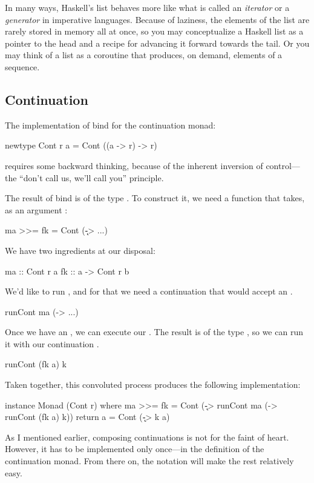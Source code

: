 \documentclass[DaoFP]{subfiles}
\begin{document}
In many ways, Haskell's list behaves more like what is called an \emph{iterator} or a \emph{generator} in imperative languages. Because of laziness, the elements of the list are rarely stored in memory all at once, so you may conceptualize a Haskell list as a pointer to the head and a recipe for advancing it forward towards the tail. Or you may think of a list as a coroutine that produces, on demand, elements of a sequence.

\subsection{Continuation}

The implementation of bind for the continuation monad:

\begin{haskell}
newtype Cont r a = Cont ((a -> r) -> r)
\end{haskell}
requires some backward thinking, because of the inherent inversion of control---the ``don't call us, we'll call you'' principle. 

The result of bind is of the type . To construct it, we need a function that takes, as an argument :
\begin{haskell}
ma >>= fk = Cont (\k -> ...)
\end{haskell}
We have two ingredients at our disposal: 
\begin{haskell}
ma :: Cont r a
fk :: a -> Cont r b
\end{haskell}
We'd like to run , and for that we need a continuation that would accept an .
\begin{haskell}
runCont ma (\a -> ...)
\end{haskell}
Once we have an , we can execute our . The result is of the type , so we can run it with our continuation . 
\begin{haskell}
runCont (fk a) k
\end{haskell}

Taken together, this convoluted process produces the following implementation:
\begin{haskell}
instance Monad (Cont r) where
  ma >>= fk = Cont (\k -> runCont ma (\a -> runCont (fk a) k))
  return a = Cont (\k -> k a)
\end{haskell}
As I mentioned earlier, composing continuations is not for the faint of heart. However, it has to be implemented only once---in the definition of the continuation monad. From there on, the  notation will make the rest relatively easy.
\end{document}
